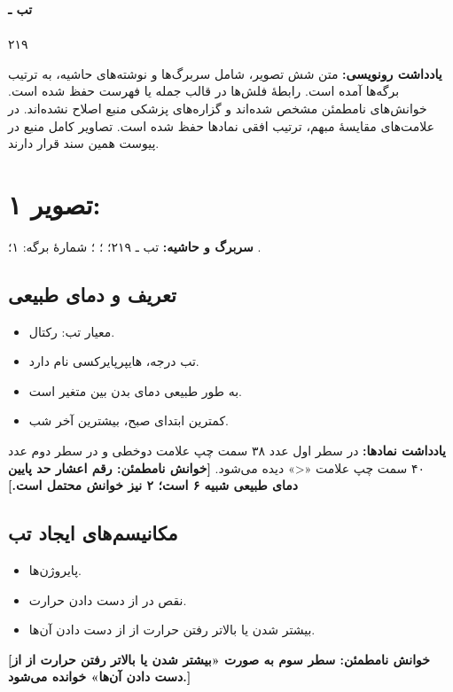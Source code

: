 \documentclass[12pt,a4paper]{article}
\begin{document}
\fi
\providecommand{\FeverUnclear}[1]{\textbf{[خوانش نامطمئن: #1]}}
\providecommand{\FeverMath}[1]{\lr{\(#1\)}}
\providecommand{\FeverPage}[2]{\clearpage\section*{تصویر #1: \lr{\texttt{pic#2.jpg}}}}
\providecommand{\FeverHeader}[1]{\textbf{سربرگ و حاشیه:} تب ـ ۲۱۹؛
  \lr{Subject:} (خالی)؛ \lr{Date: / /}؛ شمارهٔ برگه: #1؛ نشان پایین برگه: \lr{YASHA}.\par}

\begin{center}
{\Large\bfseries تب ـ }\\
\\
۲۱۹
\end{center}
\textbf{یادداشت رونویسی:} متن شش تصویر، شامل سربرگ‌ها و نوشته‌های حاشیه، به ترتیب برگه‌ها آمده است. رابطهٔ فلش‌ها در قالب جمله یا فهرست حفظ شده است. خوانش‌های نامطمئن مشخص شده‌اند و گزاره‌های پزشکی منبع اصلاح نشده‌اند. در علامت‌های مقایسهٔ مبهم، ترتیب افقی نمادها حفظ شده است. تصاویر کامل منبع در پیوست همین سند قرار دارند.

\FeverPage{۱}{01}
\textbf{سربرگ و حاشیه:} تب ـ ۲۱۹؛ ؛ ؛ شمارهٔ برگه: ۱؛ .

\subsection*{تعریف و دمای طبیعی}
\begin{itemize}
\item معیار تب: \FeverMath{38\leq} رکتال.
\item تب \FeverMath{40<} درجه، هایپرپایرکسی نام دارد.
\item به طور طبیعی دمای بدن بین  متغیر است.
\item کمترین ابتدای صبح، بیشترین آخر شب.
\end{itemize}
\textbf{یادداشت نمادها:} در سطر اول عدد ۳۸ سمت چپ علامت دوخطی و در سطر دوم عدد ۴۰ سمت چپ علامت «<» دیده می‌شود.
\FeverUnclear{رقم اعشار حد پایین دمای طبیعی شبیه ۶ است؛ ۲ نیز خوانش محتمل است.}

\subsection*{مکانیسم‌های ایجاد تب}
\begin{itemize}
\item پایروژن‌ها.
\item نقص در از دست دادن حرارت.
\item بیشتر شدن یا بالاتر رفتن حرارت از از دست دادن آن‌ها.
\end{itemize}
\FeverUnclear{سطر سوم به صورت «بیشتر شدن یا بالاتر رفتن حرارت از از دست دادن آن‌ها» خوانده می‌شود.}
\end{document}
